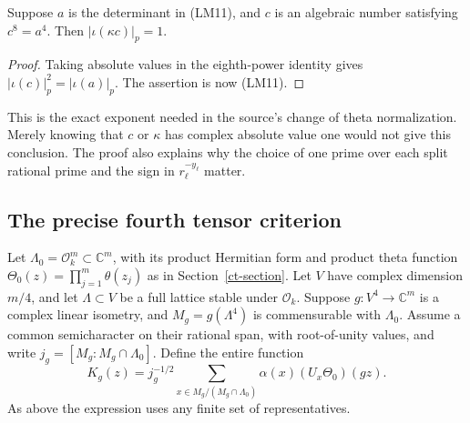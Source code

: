 \begin{corollary}\label{lm-change-scalar}
Suppose $a$ is the determinant in (LM11), and $c$ is an
algebraic number satisfying $c^8=a^4$.  Then
$|\iota(\kappa c)|_p=1$.
\end{corollary}
\begin{proof}
Taking absolute values in the eighth-power identity gives
$|\iota(c)|_p^2=|\iota(a)|_p$.
The assertion is now (LM11).
\end{proof}

This is the exact exponent needed in the source's change of
theta normalization.  Merely knowing that $c$ or $\kappa$
has complex absolute value one would not give this conclusion.
The proof also explains why the choice of one prime over each
split rational prime and the sign in $r_\ell^{-y_\ell}$ matter.

\subsection{The precise fourth tensor criterion}

Let $\Lambda_0=\mathcal O_k^m\subset\mathbb C^m$, with its
product Hermitian form and product theta function
$\Theta_0(z)=\prod_{j=1}^m\theta(z_j)$ as in
Section~\ref{ct-section}.  Let $V$ have complex dimension
$m/4$, and let $\Lambda\subset V$ be a full lattice stable
under $\mathcal O_k$.  Suppose
$g:V^4\to\mathbb C^m$ is a complex linear isometry, and
$M_g=g(\Lambda^4)$ is commensurable with $\Lambda_0$.
Assume a common semicharacter on their rational span, with
root-of-unity values, and write
$j_g=[M_g:M_g\cap\Lambda_0]$.  Define the entire function
\[
 K_g(z)=j_g^{-1/2}
       \sum_{x\in M_g/(M_g\cap\Lambda_0)}
                       \alpha(x)(U_x\Theta_0)(gz).
 \tag{LM14}
\]
As above the expression uses any finite set of representatives.

